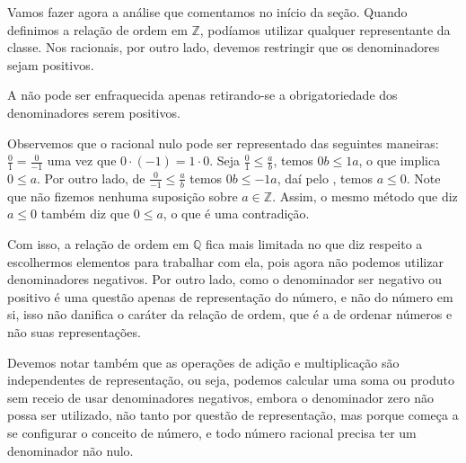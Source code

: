 \documentclass[../main.tex]{subfiles}
\begin{document}
Vamos fazer agora a análise que comentamos no início da seção. Quando definimos a relação de ordem em $\mathbb{Z}$, podíamos utilizar qualquer representante da classe. Nos racionais, por outro lado, devemos restringir que os denominadores sejam positivos.

\begin{afi}
    A  não pode ser enfraquecida apenas retirando-se a obrigatoriedade dos denominadores serem positivos.
\end{afi}

\begin{dem}
    Observemos que o racional nulo pode ser representado das seguintes maneiras: $\frac{0}{1} = \frac{0}{-1}$ uma vez que $0 \cdot (-1) = 1 \cdot 0$.
    Seja $\frac{0}{1} \leq \frac{a}{b}$, temos $0b \leq 1a$, o que implica $0 \leq a$. Por outro lado, de $\frac{0}{-1} \leq \frac{a}{b}$ temos $0b \leq -1a$,
    daí pelo , temos $a \leq 0$. Note que não fizemos nenhuma suposição sobre $a \in \mathbb{Z}$. Assim, o mesmo método que diz $a \leq 0$ também diz que $0 \leq a$, o que é uma contradição.
\end{dem}

Com isso, a relação de ordem em $\mathbb{Q}$ fica mais limitada no que diz respeito a escolhermos elementos para trabalhar com ela, pois agora não podemos utilizar denominadores negativos. Por outro lado, como o denominador ser negativo ou positivo é uma questão apenas de representação do número, e não do número em si, isso não danifica o caráter da relação de ordem, que é a de ordenar números e não suas representações. 

Devemos notar também que as operações de adição e multiplicação são independentes de representação, ou seja, podemos calcular uma soma ou produto sem receio de usar denominadores negativos, embora o denominador zero não possa ser utilizado, não tanto por questão de representação, mas porque começa a se configurar o conceito de número, e todo número racional precisa ter um denominador não nulo.
\end{document}
